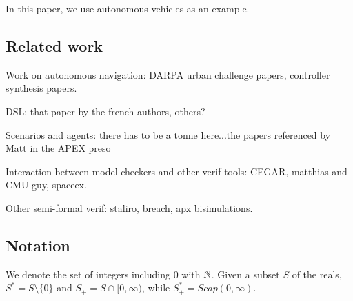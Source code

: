 In this paper, we use autonomous vehicles as an example.

\subsection{Related work}
Work on autonomous navigation: DARPA urban challenge papers, controller synthesis papers.

DSL: that paper by the french authors, others?

Scenarios and agents: there has to be a tonne here...the papers referenced by Matt in the APEX preso

Interaction between model checkers and other verif tools: CEGAR, matthias and CMU guy, spaceex.

Other semi-formal verif: staliro, breach, apx bisimulations.

\subsection{Notation}
We denote the set of integers including 0 with $\mathbb{N}$. 
Given a subset $S$ of the reals, $S^* = S \setminus \{0\}$ and $S_+ = S \cap [0,\infty)$,
while $S_+^* = S cap (0,\infty)$.